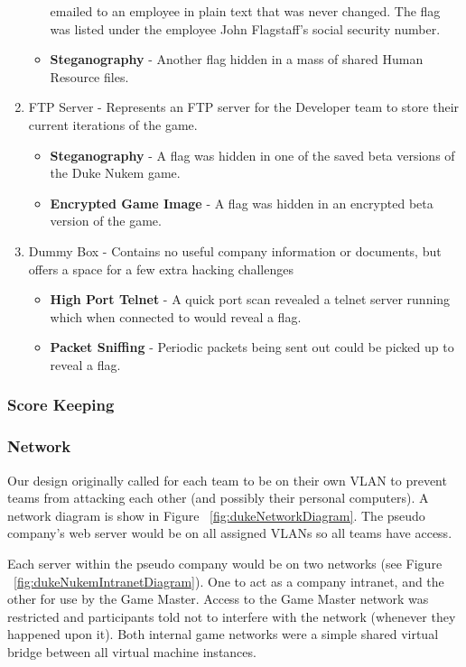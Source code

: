 \documentclass[10pt]{article}
\begin{document}
\begin{enumerate}
\begin{itemize}
        emailed to an employee in plain text that was never changed. The flag
        was listed under the employee John Flagstaff's social security number.
        \item \textbf{Steganography} - Another flag hidden in a mass of shared
        Human Resource files.        
      \end{itemize}
  \item FTP Server - Represents an FTP server for the Developer team to store
  their current iterations of the game.
      \begin{itemize}
        \item \textbf{Steganography} - A flag was hidden in one of the saved
        beta versions of the Duke Nukem game.
        \item \textbf{Encrypted Game Image} - A flag was hidden in an encrypted
        beta version of the game.
      \end{itemize}
   \item Dummy Box - Contains no useful company information or documents, but
   offers a space for a few extra hacking challenges
      \begin{itemize}
        \item \textbf{High Port Telnet} - A quick port scan revealed a telnet
        server running which when connected to would reveal a flag.
        \item \textbf{Packet Sniffing} - Periodic packets being sent out could
        be picked up to reveal a flag.
      \end{itemize}
\end{enumerate}

\subsubsection{Score Keeping}

\subsubsection{Network}
Our design originally called for each team to be on their own VLAN to prevent
teams from attacking each other (and possibly their personal computers). A
network diagram is show in Figure ~\ref{fig:dukeNetworkDiagram}. The pseudo
company's web server would be on all assigned VLANs so all teams have access.

Each server within the pseudo company would be on two networks (see Figure
~\ref{fig:dukeNukemIntranetDiagram}). One to act as a company intranet, and the
other for use by the Game Master. Access to the Game Master network was
restricted and participants told not to interfere with the network (whenever
they happened upon it). Both internal game networks were a simple shared virtual
bridge between all virtual machine instances.
\end{document}
